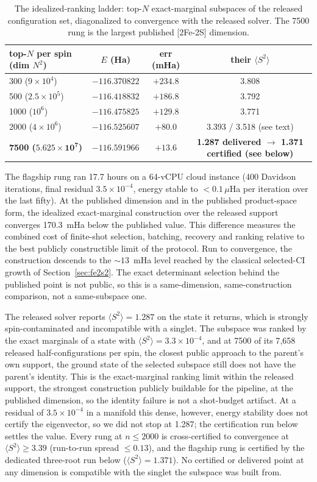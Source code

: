\documentclass[11pt]{article}
\newcommand{\ssq}{\ensuremath{\langle S^2\rangle}}
\begin{document}
\begin{table}[h]
\centering
\small
\setlength{\tabcolsep}{4pt}
\begin{tabular}{lccc}
\toprule
top-$N$ per spin (dim $N^2$) & $E$ (Ha) & err (mHa) & their \ssq{} \\
\midrule
300 ($9\times10^4$) & $-116.370822$ & $+234.8$ & 3.808 \\
500 ($2.5\times10^5$) & $-116.418832$ & $+186.8$ & 3.792 \\
1000 ($10^6$) & $-116.475825$ & $+129.8$ & 3.771 \\
2000 ($4\times10^6$) & $-116.525607$ & $+80.0$ & 3.393 / 3.518 (see text) \\
\textbf{7500 ($\mathbf{5.625\times10^7}$)} & $\mathbf{-116.591966}$ & $\mathbf{+13.6}$ & \textbf{1.287 delivered $\to$ 1.371 certified (see below)} \\
\bottomrule
\end{tabular}
\caption{The idealized-ranking ladder: top-$N$ exact-marginal subspaces of the released configuration set, diagonalized to convergence with the released solver. The 7500 rung is the largest published [2Fe-2S] dimension.}
\label{tab:flagship}
\end{table}

The flagship rung ran 17.7 hours on a 64-vCPU cloud instance (400 Davidson iterations, final residual $3.5\times10^{-4}$, energy stable to $<0.1\,\mu$Ha per iteration over the last fifty). At the published dimension and in the published product-space form, the idealized exact-marginal construction over the released support converges 170.3~mHa below the published value. This difference measures the combined cost of finite-shot selection, batching, recovery and ranking relative to the best publicly constructible limit of the protocol. Run to convergence, the construction descends to the ${\sim}13$~mHa level reached by the classical selected-CI growth of Section~\ref{sec:fe2s2}. The exact determinant selection behind the published point is not public, so this is a same-dimension, same-construction comparison, not a same-subspace one.

The released solver reports $\ssq = 1.287$ on the state it returns, which is strongly spin-contaminated and incompatible with a singlet. The subspace was ranked by the exact marginals of a state with $\ssq = 3.3\times10^{-4}$, and at 7500 of its 7{,}658 released half-configurations per spin, the closest public approach to the parent's own support, the ground state of the selected subspace still does not have the parent's identity. This is the exact-marginal ranking limit within the released support, the strongest construction publicly buildable for the pipeline, at the published dimension, so the identity failure is not a shot-budget artifact. At a residual of $3.5\times10^{-4}$ in a manifold this dense, however, energy stability does not certify the eigenvector, so we did not stop at 1.287; the certification run below settles the value. Every rung at $n \le 2000$ is cross-certified to convergence at $\ssq \ge 3.39$ (run-to-run spread $\le 0.13$), and the flagship rung is certified by the dedicated three-root run below ($\ssq = 1.371$). No certified or delivered point at any dimension is compatible with the singlet the subspace was built from.
\end{document}

